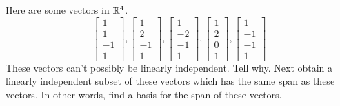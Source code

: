 \documentclass{ximera}
\begin{document}
\begin{problem}\label{prb:3.25} Here are some vectors in $\mathbb{R}^{4}$.
\begin{equation*}
\left[
\begin{array}{r}
1 \\
1 \\
-1 \\
1
\end{array}
\right] ,\left[
\begin{array}{r}
1 \\
2 \\
-1 \\
1
\end{array}
\right] ,\left[
\begin{array}{r}
1 \\
-2 \\
-1 \\
1
\end{array}
\right] ,\left[
\begin{array}{r}
1 \\
2 \\
0 \\
1
\end{array}
\right] ,\left[
\begin{array}{r}
1 \\
-1 \\
-1 \\
1
\end{array}
\right]
\end{equation*}
These vectors can't possibly be linearly independent. Tell why. Next obtain a
linearly independent subset of these vectors which has the same span as
these vectors. In other words, find a basis for the span of these vectors.
\end{problem}
\end{document}
